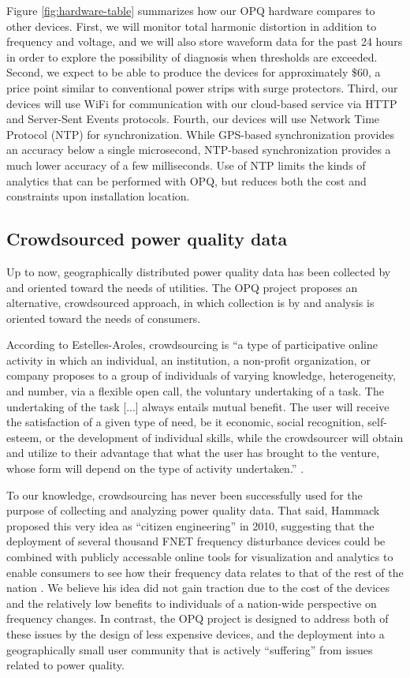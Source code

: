 \documentclass[11pt]{article}
\begin{document}
Figure \ref{fig:hardware-table} summarizes how our OPQ hardware compares to other devices. First, we will monitor total harmonic distortion in addition to frequency and voltage, and we will also store waveform data for the past 24 hours in order to explore the possibility of diagnosis when thresholds are exceeded.  Second, we expect to be able to produce the devices for approximately \$60, a price point similar to conventional power strips with surge protectors. Third, our devices will use WiFi for communication with our cloud-based service via HTTP and Server-Sent Events protocols.  Fourth, our devices will use Network Time Protocol (NTP) for synchronization.  While GPS-based synchronization provides an accuracy below a single microsecond, NTP-based synchronization provides a much lower accuracy of a few milliseconds. Use of NTP limits the kinds of analytics that can be performed with OPQ, but reduces both the cost and constraints upon installation location. 

\subsection{Crowdsourced power quality data}

Up to now, geographically distributed power quality data has been collected by and oriented toward the needs of utilities. The OPQ project proposes an alternative, crowdsourced approach, in which collection is by and analysis is oriented toward the needs of consumers.   

According to Estelles-Aroles, crowdsourcing is ``a type of participative online activity in which an individual, an institution, a non-profit organization, or company proposes to a group of individuals of varying knowledge, heterogeneity, and number, via a flexible open call, the voluntary undertaking of a task. The undertaking of the task [...] always entails mutual benefit. The user will receive the satisfaction of a given type of need, be it economic, social recognition, self-esteem, or the development of individual skills, while the crowdsourcer will obtain and utilize to their advantage that what the user has brought to the venture, whose form will depend on the type of activity undertaken.'' \cite{Estelles-Aroles2012}.

To our knowledge, crowdsourcing has never been successfully used for the purpose of collecting and analyzing power quality data.  That said, Hammack proposed this very idea as ``citizen engineering'' in 2010, suggesting that the deployment of several thousand FNET frequency disturbance devices could be combined with publicly accessable online tools for visualization and analytics to enable consumers to see how their frequency data relates to that of the rest of the nation \cite{Hammack2010}.   We believe his idea did not gain traction due to the cost of the devices and the relatively low benefits to individuals of a nation-wide perspective on frequency changes.  In contrast, the OPQ project is designed to address both of these issues by the design of less expensive devices, and the deployment into a geographically small user community that is actively ``suffering'' from issues related to power quality.  
\end{document}
